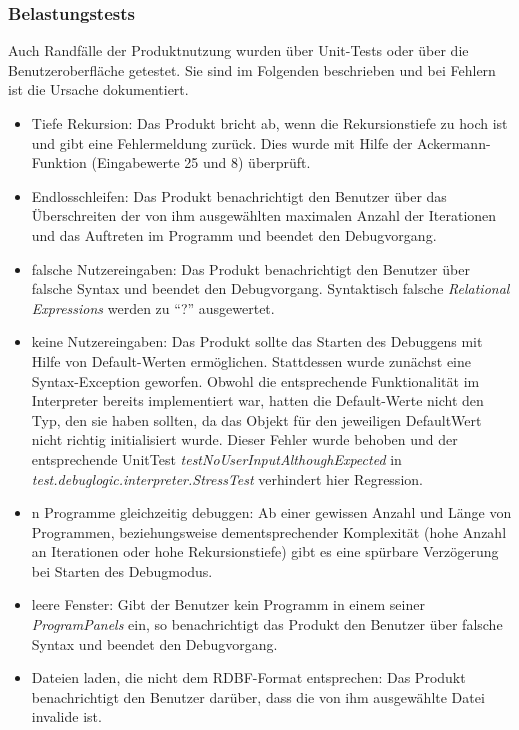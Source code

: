 \documentclass[parskip=full]{scrartcl}
\begin{document}
\subsubsection{Belastungstests} %
\label{stress}
Auch Randfälle der Produktnutzung wurden über Unit-Tests oder über die Benutzeroberfläche getestet. Sie sind im Folgenden beschrieben und bei Fehlern ist die Ursache dokumentiert.
\begin{itemize}
\item Tiefe Rekursion: Das Produkt bricht ab, wenn die Rekursionstiefe zu hoch ist und gibt eine Fehlermeldung zurück. Dies wurde mit Hilfe der Ackermann-Funktion (Eingabewerte 25 und 8) überprüft.
\item Endlosschleifen: Das Produkt benachrichtigt den Benutzer über das Überschreiten der von ihm ausgewählten maximalen Anzahl der Iterationen und das Auftreten im Programm und beendet den Debugvorgang.
\item falsche Nutzereingaben: Das Produkt benachrichtigt den Benutzer über falsche Syntax und beendet den Debugvorgang. Syntaktisch falsche \textit{Relational Expressions} werden zu \enquote{?} ausgewertet.
\item keine Nutzereingaben: Das Produkt sollte das Starten des Debuggens mit Hilfe von Default-Werten ermöglichen. Stattdessen wurde zunächst eine Syntax-Exception geworfen. Obwohl die entsprechende Funktionalität im Interpreter bereits implementiert war, hatten die Default-Werte nicht den Typ, den sie haben sollten, da das Objekt für den jeweiligen DefaultWert nicht richtig initialisiert wurde. Dieser Fehler wurde behoben und der entsprechende UnitTest \textit{testNoUserInputAlthoughExpected} in \textit{test.debuglogic.interpreter.StressTest} verhindert hier Regression.
\item n Programme gleichzeitig debuggen: Ab einer gewissen Anzahl und Länge von Programmen, beziehungsweise dementsprechender Komplexität (hohe Anzahl an Iterationen oder hohe Rekursionstiefe) gibt es eine spürbare Verzögerung bei Starten des Debugmodus.
\item leere Fenster: Gibt der Benutzer kein Programm in einem seiner \textit{ProgramPanels} ein, so benachrichtigt das Produkt den Benutzer über falsche Syntax und beendet den Debugvorgang.
\item Dateien laden, die nicht dem RDBF-Format entsprechen: Das Produkt benachrichtigt den Benutzer darüber, dass die von ihm ausgewählte Datei invalide ist.

\end{itemize}
\end{document}
